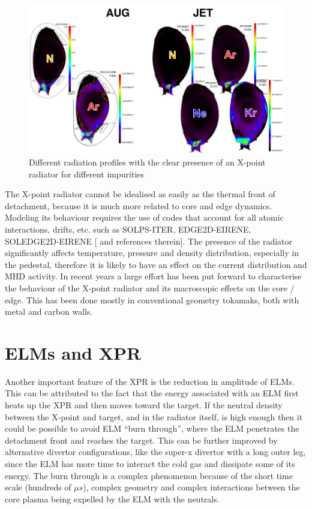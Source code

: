 \begin{figure}[!ht]
	\centering
	\includegraphics[width=\linewidth]{Chapters/chapter1/figs/xprs.png}
	\caption{Different radiation profiles with the clear presence of an X-point radiator for different impurities
	\cite{Wiesen2017}}
	\label{fig:xprs}
\end{figure}

The X-point radiator cannot be idealised as easily as the thermal front of detachment, because it is much more related to core and edge dynamics. Modeling its behaviour requires the use of codes that account for all atomic interactions, drifts, etc. such as SOLPS-ITER, EDGE2D-EIRENE, SOLEDGE2D-EIRENE [\cite{Wiesen2017a} and references therein]. The presence of the radiator significantly affects temperature, pressure and density distribution, especially in the pedestal, therefore it is likely to have an effect on the current distribution and MHD activity.
In recent years a large effort has been put forward to characterise the behaviour of the X-point radiator and its macroscopic effects on the core / edge. This has been done mostly in conventional geometry tokamaks, both with metal and carbon walls.


\section{ELMs and XPR}
Another important feature of the XPR is the reduction in amplitude of ELMs. This can be attributed to the fact that the energy associated with an ELM first heats up the XPR and then moves toward the target. If the neutral density between the X-point and target, and in the radiator itself, is high enough then it could be possible to avoid ELM “burn through”, where the ELM penetrates the detachment front and reaches the target. \cite{Krasheninnikov2016} This can be further improved by alternative divertor configurations, like the super-x divertor with a long outer leg, since the ELM has more time to interact the cold gas and dissipate some of its energy. The burn through is a complex phenomenon because of the short time scale (hundreds of $\mu s$), complex geometry and complex interactions between the core plasma being expelled by the ELM with the neutrals.

